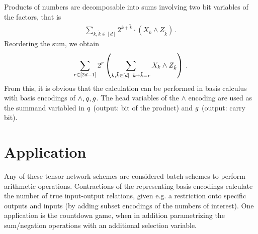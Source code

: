 \documentclass[aps,onecolumn,nofootinbib,pra]{article}
\begin{document}
    Products of numbers are decomposable into sums involving two bit variables of the factors, that is
    \begin{align*}
        \sum_{k,\tilde{k} \in [d]} 2^{k+\tilde{k}} \cdot (X_k \land Z_{\tilde{k}}) \, .
    \end{align*}
    Reordering the sum, we obtain
    \begin{align*}
       \sum_{r\in[2d-1]} 2^{r} \left(\sum_{k,\tilde{k} \in [d] \,:\, k +\tilde{k}=r}  X_k \land Z_{\tilde{k}} \right) \, .
    \end{align*}
    From this, it is obvious that the calculation can be performed in basis calculus with basis encodings of $\land,q,g$.
    The head variables of the $\land$ encoding are used as the summand variabled in $q$ (output: bit of the product) and $g$ (output: carry bit).

    \section{Application}

    Any of these tensor network schemes are considered batch schemes to perform arithmetic operations.
    Contractions of the representing basis encodings calculate the number of true input-output relations, given e.g. a restriction onto specific outputs and inputs (by adding subset encodings of the numbers of interest).
    One application is the countdown game, when in addition parametrizing the sum/negation operations with an additional selection variable.
\end{document}
